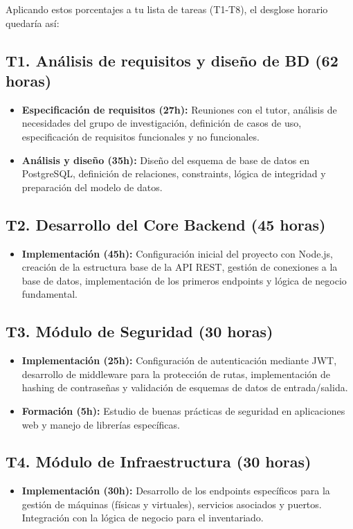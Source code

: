 \documentclass[11pt,a4paper]{article}
\begin{document}
Aplicando estos porcentajes a tu lista de tareas (T1-T8), el desglose horario quedaría así:

\subsection*{T1. Análisis de requisitos y diseño de BD (62 horas)}
\begin{itemize}
    \item \textbf{Especificación de requisitos (27h):} Reuniones con el tutor, análisis de necesidades del grupo de investigación, definición de casos de uso, especificación de requisitos funcionales y no funcionales.
    \item \textbf{Análisis y diseño (35h):} Diseño del esquema de base de datos en PostgreSQL, definición de relaciones, constraints, lógica de integridad y preparación del modelo de datos.
\end{itemize}

\subsection*{T2. Desarrollo del Core Backend (45 horas)}
\begin{itemize}
    \item \textbf{Implementación (45h):} Configuración inicial del proyecto con Node.js, creación de la estructura base de la API REST, gestión de conexiones a la base de datos, implementación de los primeros endpoints y lógica de negocio fundamental.
\end{itemize}

\subsection*{T3. Módulo de Seguridad (30 horas)}
\begin{itemize}
    \item \textbf{Implementación (25h):} Configuración de autenticación mediante JWT, desarrollo de middleware para la protección de rutas, implementación de hashing de contraseñas y validación de esquemas de datos de entrada/salida.
    \item \textbf{Formación (5h):} Estudio de buenas prácticas de seguridad en aplicaciones web y manejo de librerías específicas.
\end{itemize}

\subsection*{T4. Módulo de Infraestructura (30 horas)}
\begin{itemize}
    \item \textbf{Implementación (30h):} Desarrollo de los endpoints específicos para la gestión de máquinas (físicas y virtuales), servicios asociados y puertos. Integración con la lógica de negocio para el inventariado.
\end{itemize}
\end{document}
